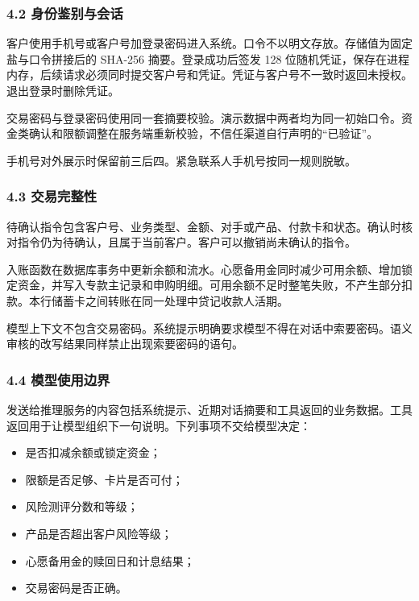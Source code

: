 \documentclass[
  a4paper,
  zihao=5,
  fontset=none]{ctexart}
\providecommand{\tightlist}{%
  \setlength{\itemsep}{0pt}\setlength{\parskip}{0pt}}
\begin{document}
\subsubsection{4.2
身份鉴别与会话}\label{ux8eabux4efdux9274ux522bux4e0eux4f1aux8bdd}

客户使用手机号或客户号加登录密码进入系统。口令不以明文存放。存储值为固定盐与口令拼接后的
SHA-256 摘要。登录成功后签发 128
位随机凭证，保存在进程内存，后续请求必须同时提交客户号和凭证。凭证与客户号不一致时返回未授权。退出登录时删除凭证。

交易密码与登录密码使用同一套摘要校验。演示数据中两者均为同一初始口令。资金类确认和限额调整在服务端重新校验，不信任渠道自行声明的``已验证''。

手机号对外展示时保留前三后四。紧急联系人手机号按同一规则脱敏。

\subsubsection{4.3 交易完整性}\label{ux4ea4ux6613ux5b8cux6574ux6027}

待确认指令包含客户号、业务类型、金额、对手或产品、付款卡和状态。确认时核对指令仍为待确认，且属于当前客户。客户可以撤销尚未确认的指令。

入账函数在数据库事务中更新余额和流水。心愿备用金同时减少可用余额、增加锁定资金，并写入专款主记录和申购明细。可用余额不足时整笔失败，不产生部分扣款。本行储蓄卡之间转账在同一处理中贷记收款人活期。

模型上下文不包含交易密码。系统提示明确要求模型不得在对话中索要密码。语义审核的改写结果同样禁止出现索要密码的语句。

\subsubsection{4.4
模型使用边界}\label{ux6a21ux578bux4f7fux7528ux8fb9ux754c}

发送给推理服务的内容包括系统提示、近期对话摘要和工具返回的业务数据。工具返回用于让模型组织下一句说明。下列事项不交给模型决定：

\begin{itemize}
\tightlist
\item
  是否扣减余额或锁定资金；
\item
  限额是否足够、卡片是否可付；
\item
  风险测评分数和等级；
\item
  产品是否超出客户风险等级；
\item
  心愿备用金的赎回日和计息结果；
\item
  交易密码是否正确。
\end{itemize}
\end{document}
